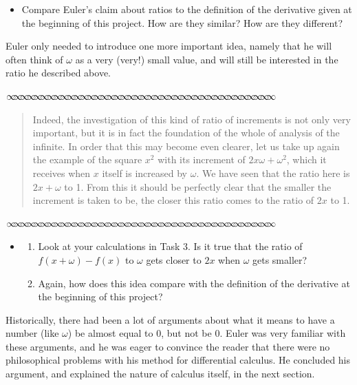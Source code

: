 \documentclass[11pt]{article}
\newcommand{\sep}{\vspace{-3pt}
\begin{center}
{\mathversion{normal}
$\infty \mspace{-5.5mu}\infty \mspace{-5.5mu}\infty \mspace{-5.5mu}\infty \mspace{-5.5mu}
\infty \mspace{-5.5mu}\infty \mspace{-5.5mu}\infty \mspace{-5.5mu}\infty \mspace{-5.5mu}
\infty \mspace{-5.5mu}\infty \mspace{-5.5mu}\infty \mspace{-5.5mu}\infty \mspace{-5.5mu}
\infty \mspace{-5.5mu}\infty \mspace{-5.5mu}\infty \mspace{-5.5mu}\infty \mspace{-5.5mu}
\infty \mspace{-5.5mu}\infty \mspace{-5.5mu}\infty \mspace{-5.5mu}\infty \mspace{-5.5mu}
\infty \mspace{-5.5mu}\infty \mspace{-5.5mu}\infty \mspace{-5.5mu}\infty \mspace{-5.5mu}
\infty \mspace{-5.5mu}\infty \mspace{-5.5mu}\infty \mspace{-5.5mu}\infty \mspace{-5.5mu}
\infty \mspace{-5.5mu}\infty \mspace{-5.5mu}\infty \mspace{-5.5mu}\infty \mspace{-5.5mu}
\infty \mspace{-5.5mu}\infty \mspace{-5.5mu}\infty \mspace{-5.5mu}\infty \mspace{-5.5mu}
\infty \mspace{-5.5mu}\infty \mspace{-5.5mu}\infty \mspace{-5.5mu}\infty \mspace{-5.5mu}$}
\end{center} \vspace*{-5pt}}
\newenvironment{source}%
 {\bigskip \sep \vspace*{-6pt} \begin{quote}
          \begin{sf}   }
   {   \end{sf}     \end{quote} \vspace*{-6pt} \sep \bigskip}%
\newcounter{tasknumb}
\newcommand{\tasknumb}{\stepcounter{tasknumb}\textmd{\textbf{$\fbox{$\fbox{Task \thetasknumb}$}$}}}
\newenvironment{task}%
 {\begin{itemize}
 \item[\tasknumb]  }
{
    \end{itemize}    }%
\begin{document}
\begin{task}
Compare Euler's claim about ratios to the definition of the derivative given at the beginning of this project.   How are they similar?  How are they different?
\end{task}

Euler only needed to introduce one more important idea, namely that he will often think of $\omega$ as a very (very!) small value, and will still be interested in the ratio he described above.




\begin{source}

Indeed, the investigation of this kind of ratio of increments is not
only very important, but it is in fact the foundation of the whole of analysis
of the infinite. In order that this may become even clearer, let us take up
again the example of the square $x^2$ with its increment of $2x\omega +\omega^2$, which
it receives when $x$ itself is increased by $\omega$. We have seen that the ratio here
is $2x + \omega$ to 1. From this it should be perfectly clear that the smaller the
increment is taken to be, the closer this ratio comes to the ratio of $2x$ to
1.
\vspace*{-8pt}
\end{source}

\begin{task}
\begin{enumerate}
\item[(a)]  Look at your calculations in Task 3. Is it true that the ratio of  $f(x + \omega) - f(x)$ to $\omega$ gets closer to $2x$ when $\omega$ gets smaller?
\item[(b)] Again, how does this idea compare with the definition of the derivative at the beginning of this project?
    \end{enumerate}
\end{task}

Historically, there had been a lot of arguments about what it means to have a number (like $\omega$) be almost equal to $0$, but not be $0$.  Euler was very familiar with these arguments, and he was eager to convince the reader that there were no philosophical problems with his method for differential calculus.  He concluded his argument, and explained the nature of calculus itself, in the next section.
\end{document}
